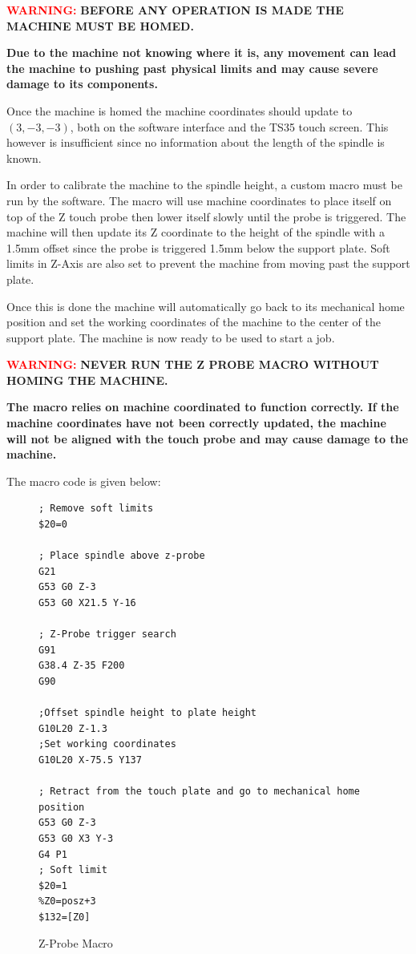 \documentclass[11pt, openright]{book}
\begin{document}
         \begin{dent}{\textcolor{red}{\textbf{WARNING:}}}
                \textbf{BEFORE ANY OPERATION IS MADE THE MACHINE MUST BE HOMED.}

                \textbf{Due to the machine not knowing where it is, any movement can lead the machine to pushing past physical limits and may cause severe damage to its components.}
        \end{dent}

        Once the machine is homed the machine coordinates should update to $(3,-3,-3)$, both on the software interface and the TS35 touch screen. This however is insufficient since no information about the length of the spindle is known. 
    
        In order to calibrate the machine to the spindle height, a custom macro must be run by the software. The macro will use machine coordinates to place itself on top of the Z touch probe then lower itself slowly until the probe is triggered. The machine will then update its Z coordinate to the height of the spindle with a 1.5mm offset since the probe is triggered 1.5mm below the support plate.
        Soft limits in Z-Axis are also set to prevent the machine from moving past the support plate.

        Once this is done the machine will automatically go back to its mechanical home position and set the working coordinates of the machine to the center of the support plate. The machine is now ready to be used to start a job.

         \begin{dent}{\textcolor{red}{\textbf{WARNING:}}}
            \textbf{NEVER RUN THE Z PROBE MACRO WITHOUT HOMING THE MACHINE.}
            
            \textbf{The macro relies on machine coordinated to function correctly. If the machine coordinates  have not been correctly updated, the machine will not be aligned with the touch probe and may cause damage to the machine.}

        \end{dent}

        The macro code is given below:
         \begin{figure}[ht!]
         \begin{lstlisting}
; Remove soft limits
$20=0

; Place spindle above z-probe
G21
G53 G0 Z-3
G53 G0 X21.5 Y-16

; Z-Probe trigger search
G91
G38.4 Z-35 F200
G90

;Offset spindle height to plate height
G10L20 Z-1.3
;Set working coordinates
G10L20 X-75.5 Y137

; Retract from the touch plate and go to mechanical home position
G53 G0 Z-3
G53 G0 X3 Y-3
G4 P1
; Soft limit
$20=1
%Z0=posz+3
$132=[Z0]
        \end{lstlisting}
        \caption{Z-Probe Macro}
    \end{figure}
\end{document}
